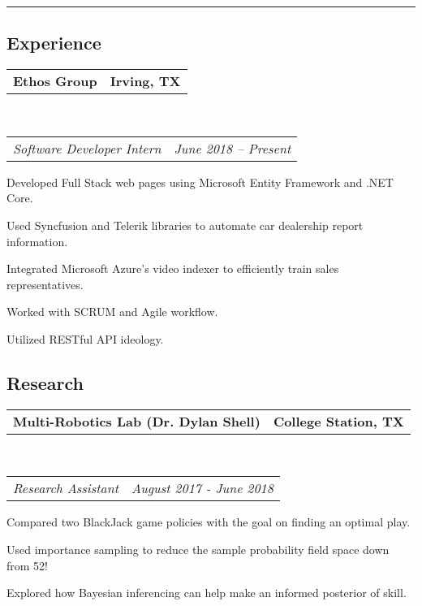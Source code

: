 \documentclass[10pt,letterpaper]{article}
\makeatletter
\newenvironment{indentsection}[1]%
{\begin{list}{}%
	{\setlength{\leftmargin}{#1}}%
	\item[]%
}
{\end{list}}
\newcommand{\headerrow}[2]
{\begin{tabular*}{\linewidth}{l@{\extracolsep{\fill}}r}
	#1 &
	#2 \\
\end{tabular*}}
\makeatother
\begin{document}
\hrule
\vspace{-0.8em}
\subsection*{Experience}
\begin{indentsection}{\parindent}
	\vspace{-0.4em}
	\headerrow
		{\textbf{Ethos Group}}
		{\textbf{Irving, TX}}
	\\
	\headerrow
		{\emph{Software Developer Intern}}
		{\emph{June 2018 -- Present}}
	\begin{itemize*}
		\item Developed Full Stack web pages using Microsoft Entity Framework and .NET Core. 
		\item Used Syncfusion and Telerik libraries to automate car dealership report information.
		\item Integrated Microsoft Azure's video indexer to efficiently train sales representatives. 
		\item Worked with SCRUM and Agile workflow.
		\item Utilized RESTful API ideology.
	\end{itemize*}
\end{indentsection}

\vspace{-1.8em}
\subsection*{Research}
\begin{indentsection}{\parindent}
	\vspace{-0.4em}
	\headerrow
		{\textbf{Multi-Robotics Lab (Dr. Dylan Shell)}}
		{\textbf{College Station, TX}}
	\\
	\headerrow
		{\emph{Research Assistant}}
		{\emph{August 2017 - June 2018}}
	\begin{itemize*}
		\item Compared two BlackJack game policies with the goal on finding an optimal play. 
		\item Used importance sampling to reduce the sample probability field space down from 				52!
		\item Explored how Bayesian inferencing can help make an informed posterior of skill. 
	\end{itemize*}
\end{indentsection}

\vspace{-1.8em}
\end{document}
